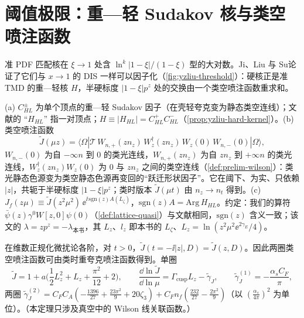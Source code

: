 \section{阈值极限：重—轻 Sudakov 核与类空喷注函数}\label{sec:yzliu-threshold}

准 PDF 匹配核在 $\xi\to1$ 处含 $\ln^k|1-\xi|/(1-\xi)$ 型的大对数。Ji、Liu 与 Su\cite{Ji:2023pba}论证了它们与 $x\to1$ 的 DIS 一样可以因子化（\cref{fig:yzliu-threshold}）：硬核正是准 TMD 的重—轻核 $H$，半硬标度 $|1-\xi|p^z$ 处的交换由一个类空喷注函数重求和。


\begin{definition}\label{def:yzliu-hl-jet}
(a) $C^\pm_{HL}$ 为单个顶点的重—轻 Sudakov 因子（在壳轻夸克变为静态类空连线）；文献\cite{Ji:2023pba}的 “$H_{HL}$” 指一对顶点；$H\equiv|H_{HL}|=C^+_{HL}C^-_{HL}$（\cref{prop:yzliu-hard-kernel}）。(b) 类空喷注函数 %
\begin{equation}\label{eq:yzliu-jet-def}
\tilde J(\mu z)=\langle\Omega|\mathcal T\,W_{n,+}(zn_z)\,W_z^\dagger(zn_z)\,W_z(0)\,W_{n,-}(0)|\Omega\rangle ,
\end{equation}
$W_{n,-}(0)$ 为自 $-\infty n$ 到 $0$ 的类光连线，$W_{n,+}(zn_z)$ 为自 $zn_z$ 到 $+\infty n$ 的类光连线，$W_z^\dagger(zn_z)W_z(0)$ 为 $0$ 与 $zn_z$ 之间的类空连线（\cref{def:prelim-wilson}）：类光静态色源变为类空静态色源再变回的“跃迁形状因子”。它在阈下、为实、只依赖 $|z|$，共轭于半硬标度 $|1-\xi|p^z$；类时版本 $\tilde J(\mu t)$ 由 $n_z\to n_t$ 得到。(c) $J_f(z\mu)\equiv\tilde J(z^2\mu^2)\,\ee^{\ii\,\mathrm{sgn}(z)A(L_\zeta)}$，$\mathrm{sgn}(z)A=\mathrm{Arg}\,H_{HL}$。约定：我们的算符 $\bar\psi(z)\gamma^0W[z,0]\psi(0)$（\cref{def:lattice-quasi}）与文献\cite{Ji:2023pba}相同，$\mathrm{sgn}(z)$ 含义一致；该文的 $\lambda=zp^z=-\lambda_{\text{本书}}$，其 $L_z$、$l_z$ 即本书的 $L_\zeta$、$L_z=\ln(z^2\mu^2\ee^{2\gamma_E}/4)$。
\end{definition}

\begin{theorem}\label{thm:yzliu-jet-continuation}
在维数正规化微扰论各阶，对 $t>0$，$\tilde J(t=-\ii|z|,D)=\tilde J(z,D)$。因此两圈类空喷注函数可由类时重夸克喷注函数\cite{Jain:2008gb}得到。单圈 %
\begin{equation}\label{eq:yzliu-jet-1loop}
\tilde J=1+a\Big(\frac12L_z^2+L_z+\frac{\pi^2}{12}+2\Big),\qquad \frac{\dd\ln\tilde J}{\dd\ln\mu}=\Gamma_{\mathrm{cusp}}L_z-\tilde\gamma_J,\qquad \tilde\gamma^{(1)}_J=-\frac{\alpha_sC_F}{\pi},
\end{equation}
两圈 $\tilde\gamma^{(2)}_J=C_FC_A(-\frac{1396}{27}+\frac{23\pi^2}9+20\zeta_3)+C_Fn_f(\frac{232}{27}-\frac{2\pi^2}9)$（以 $(\frac{\alpha_s}{4\pi})^2$ 为单位）。（本定理只涉及真空中的 Wilson 线关联函数。）
\end{theorem}

